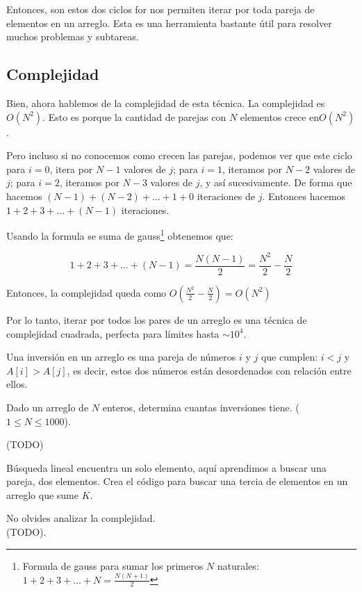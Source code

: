 Entonces, son estos dos ciclos for nos permiten iterar por toda pareja de elementos en un arreglo. Esta es una herramienta bastante útil para resolver muchos problemas y subtareas.

\subsection {Complejidad}
Bien, ahora hablemos de la complejidad de esta técnica. La complejidad es \(O(N^2)\). Esto es porque la cantidad de parejas con \(N\) elementos crece en\(O(N^2)\).

Pero incluso si no conocemos como crecen las parejas, podemos ver que este ciclo para \(i = 0\), itera por \(N-1\) valores de \(j\); para \(i=1\), iteramos por \(N-2\) valores de \(j\); para \(i=2\), iteramos por \(N-3\) valores de \(j\), y así sucesivamente. De forma que hacemos \((N-1)+(N-2)+\ldots+1+0\) iteraciones de \(j\). Entonces hacemos \(1+2+3+\ldots+(N-1)\) iteraciones.

Usando la formula se suma de gauss\footnote{Formula de gauss para sumar los primeros \(N\) naturales: \(1+2+3+\ldots+N=\frac{N(N+1)}{2}\)} obtenemos que:

\[1+2+3+\ldots+(N-1)=\frac{N(N-1)}{2}=\frac{N^2}{2}-\frac{N}{2}\]

Entonces, la complejidad queda como \(O(\frac{N^2}{2}-\frac{N}{2})=O(N^2)\)

Por lo tanto, iterar por todos los pares de un arreglo es una técnica de complejidad cuadrada, perfecta para límites hasta \(\sim{10^4}\).

\begin{exercise}
	Una inversión en un arreglo es una pareja de números \(i\) y \(j\) que cumplen: \(i < j\) y \(A[i] > A[j]\), es decir, estos dos números están desordenados con relación entre ellos.
	
	Dado un arreglo de \(N\) enteros, determina cuantas inversiones tiene. (\(1\leq N \leq 1000\)).
	
	(TODO)
\end{exercise}

\begin{exercise}
	Búsqueda lineal encuentra un solo elemento, aquí aprendimos a buscar una pareja, dos elementos. Crea el código para buscar una tercia de elementos en un arreglo que sume \(K\).
		
	No olvides analizar la complejidad.\\
	(TODO).
\end{exercise}


